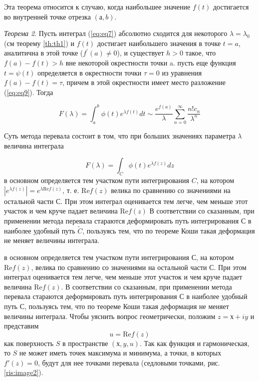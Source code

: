 \documentclass[14pt]{extarticle}
\renewcommand{\Re}{\mathrm{Re}}
\begin{document}
Эта теорема относится к случаю, когда наибольшее значение $f(t)$ достигается во внутренней точке отрезка $(а, b)$. 

\textit{Теорема 2\label{th:th2}}. Пусть интеграл (\ref{eq:eq7}) абсолютно сходится для некоторого $\lambda = \lambda_0$ (см теорему \ref{th:th1}) и $f(t)$ достигает наибольшего значения в точке $t=a$, аналитична в этой точке ($f^\prime(a) \neq 0$), и существует $h>0$ такое, что $f(a)-f(t)>h$ вне некоторой окрестности точки a. пусть еще функция $t=\psi(t)$ определяется в окрестности точки $\tau=0$ из уравнения $f(a) - f(t) = \tau$, причем в этой окрестности имеет место разложение (\ref{eq:eq9}). Тогда

\begin{equation}\label{eq:eq10}
F(\lambda) = \int_{a}^{b}\phi(t)e^{\lambda f(t)}dt \sim \frac{e^{f(a)}}{\lambda}\sum_{n=0}^{\infty}\frac{n! c_n}{\lambda^n}
\end{equation}
  
Суть метода перевала состоит в том, что при больших значениях параметра $\lambda$ величина интеграла
  
$$
F(\lambda) = \int_{C}^{}\phi(t)e^{\lambda f(z)}dz
$$
в основном определяется тем участком пути интегрирования $C$, на котором $|e^{\lambda f(z)}|=e^{\lambda \Re f(z)}$, т. е. $\Re f(z)$ велика по сравнению со значениями на остальной части $С$. При этом интеграл оценивается тем легче, чем меньше этот участок и чем круче падает величина $\Re f(z)$ В соответствии со сказанным, при применении метода перевала стараются деформировать путь интегрирования С в наиболее удобный путь $\widetilde{C}$, пользуясь тем, что по теореме Коши такая деформация не меняет величины интеграла.\cite{Lavrentyev}
  
в основном определяется тем участком пути интегрирования $С$, на котором  $\Re f(z)$, велика по сравнению со значениями на остальной части $С$. При этом интеграл оценивается тем легче, чем меньше этот участок и чем круче падает величина $\Re f(z)$. В соответствии со сказанным, при применении метода перевала стараются деформировать путь интегрирования С в наиболее удобный путь С, пользуясь тем, что по теореме Коши такая деформация не меняет величины интеграла.
Чтобы уяснить вопрос геометрически, положим $z = х + iy$ и представим
$$
u = \Re f(z)
$$
как поверхность $S$ в пространстве $(х, y, u)$. Так как функция и гармоническая, то $S$ не может иметь точек максимума и минимума, а точки, в которых $f'(z) = 0$, будут для нее точками перевала (седловыми точками, рис. \ref{ris:image2}).
\end{document}
